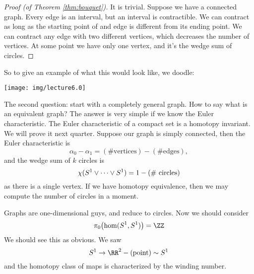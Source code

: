 \begin{proof}[Proof (of Theorem \ref{thm:bouquet})]
It is trivial. Suppose we have a connected graph. Every edge is an
interval, but an interval is contractible. We can contract as
long as the starting point of and edge is different from its
ending point. We can contract any edge with two different
vertices, which decreases the number of vertices. At some point
we have only one vertex, and it's the wedge sum of circles.
\end{proof}

So to give an example of what this would look like, we doodle:
\begin{center}
  \texttt{[image: img/lecture6.0]}
\end{center}

\bigbreak
The second question: start with a completely general graph. How
to say what is an equivalent graph? The answer is very simple if
we know the Euler characteristic. The Euler characteristic of a
compact set is a homotopy invariant. We will prove it next
quarter. Suppose our graph is simply connected, then the Euler
characteristic is
\begin{equation}
\alpha_0-\alpha_1=(\mbox{\# vertices})-(\mbox{\# edges}),
\end{equation}
and the wedge sum of $k$ circles is
\begin{equation}
\chi(S^{1}\vee\dots\vee S^{1})=1-(\mbox{\# circles})
\end{equation}
as there is a single vertex. If we have homotopy equivalence,
then we may compute the number of circles in a moment.

Graphs are one-dimensional guys, and reduce to circles. Now we
should consider
\begin{equation}
\pi_{0}\bigl(\hom(S^1,S^1)\bigr)=\ZZ
\end{equation}
We should see this as obvious. We saw
\begin{equation}
S^1\to \RR^2-(\mbox{point})\homotopic S^{1}
\end{equation}
and the homotopy class of maps is characterized by the winding
number.
